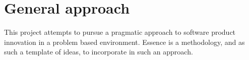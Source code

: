 
\section*{General approach}
\label{sec:general_approach}

This project attempts to pursue a pragmatic approach to software product innovation in a problem based environment. Essence \parencite{essence_book} is a methodology, and as such a template of ideas, to incorporate in such an approach.   


